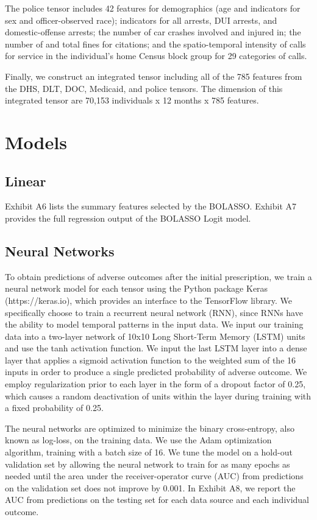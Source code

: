 \documentclass[11pt, letter]{article}
\begin{document}
The police tensor includes 42 features for demographics (age and indicators for sex and officer-observed race); indicators for all arrests, DUI arrests, and domestic-offense arrests; the number of car crashes involved and injured in; the number of and total fines for citations; and the spatio-temporal intensity of calls for service in the individual's home Census block group for 29 categories of calls.

Finally, we construct an integrated tensor including all of the 785 features from the DHS, DLT, DOC, Medicaid, and police tensors. The dimension of this integrated tensor are 70,153 individuals x 12 months x 785 features.

\section{Models}

\subsection{Linear}

Exhibit A6 lists the summary features selected by the BOLASSO. Exhibit A7 provides the full regression output of the BOLASSO Logit model.

\subsection{Neural Networks}

To obtain predictions of adverse outcomes after the initial prescription, we train a neural network model for each tensor using the Python package Keras (https://keras.io), which provides an interface to the TensorFlow library. We specifically choose to train a recurrent neural network (RNN), since RNNs have the ability to model temporal patterns in the input data. We input our training data into a two-layer network of 10x10 Long Short-Term Memory (LSTM) units and use the tanh activation function. We input the last LSTM layer into a dense layer that applies a sigmoid activation function to the weighted sum of the 16 inputs in order to produce a single predicted probability of adverse outcome. We employ regularization prior to each layer in the form of a dropout factor of 0.25, which causes a random deactivation of units within the layer during training with a fixed probability of 0.25.

The neural networks are optimized to minimize the binary cross-entropy, also known as log-loss, on the training data. We use the Adam optimization algorithm, training with a batch size of 16. We tune the model on a hold-out validation set by allowing the neural network to train for as many epochs as needed until the area under the receiver-operator curve (AUC) from predictions on the validation set does not improve by 0.001. In Exhibit A8, we report the AUC from predictions on the testing set for each data source and each individual outcome.
\end{document}
